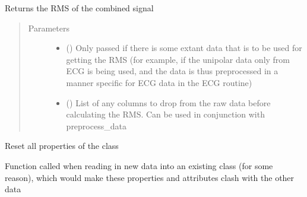 \documentclass[letterpaper,10pt,english]{sphinxmanual}
\begin{document}
\begin{fulllineitems}
\begin{fulllineitems}
\label{\detokenize{_autosummary/signalanalysis.ecg.Ecg:signalanalysis.ecg.Ecg.get_rms}}
\sphinxAtStartPar
Returns the RMS of the combined signal
\begin{quote}\begin{description}
\item[{Parameters}] \leavevmode\begin{itemize}
\item {} 
\sphinxAtStartPar
{} (\sphinxstyleliteralemphasis{\sphinxupquote{, }}) \textendash{} Only passed if there is some extant data that is to be used for getting the RMS (for example,
if the unipolar data only from ECG is being used, and the data is thus preprocessed in a manner specific
for ECG data in the ECG routine)

\item {} 
\sphinxAtStartPar
{} (\sphinxstyleliteralemphasis{\sphinxupquote{, }}) \textendash{} List of any columns to drop from the raw data before calculating the RMS. Can be used in conjunction with
preprocess\_data

\end{itemize}

\end{description}\end{quote}

\end{fulllineitems}


\begin{fulllineitems}
\label{\detokenize{_autosummary/signalanalysis.ecg.Ecg:signalanalysis.ecg.Ecg.reset}}
\sphinxAtStartPar
Reset all properties of the class

\sphinxAtStartPar
Function called when reading in new data into an existing class (for some reason), which would make these
properties and attributes clash with the other data

\end{fulllineitems}


\end{fulllineitems}
\end{document}
